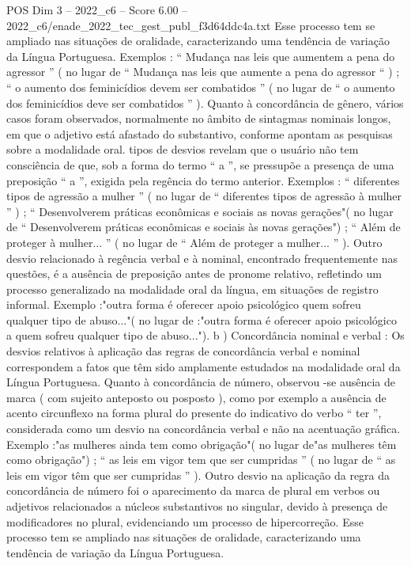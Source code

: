 \begin{textsample}{POS Dim 3 – 2022\_c6 – Score 6.00 – 2022\_c6/enade\_2022\_tec\_gest\_publ\_f3d64ddc4a.txt}
Esse processo tem se ampliado nas situações de oralidade, caracterizando uma tendência de variação da Língua Portuguesa.
Exemplos : “ Mudança nas leis que aumentem a pena do agressor ” ( no lugar de “ Mudança nas leis que aumente a pena do agressor “ ) ; “ o aumento dos feminicídios devem ser combatidos ” ( no lugar de “ o aumento dos feminicídios deve ser combatidos ” ).
Quanto à concordância de gênero, vários casos foram observados, normalmente no âmbito de sintagmas nominais longos, em que o adjetivo está afastado do substantivo, conforme apontam as pesquisas sobre a modalidade oral. tipos de desvios revelam que o usuário não tem consciência de que, sob a forma do termo “ a ”, se pressupõe a presença de uma preposição “ a ”, exigida pela regência do termo anterior.
Exemplos : “ diferentes tipos de agressão a mulher ” ( no lugar de “ diferentes tipos de agressão à mulher ” ) ; “ Desenvolverem práticas econômicas e sociais as novas gerações"( no lugar de “ Desenvolverem práticas econômicas e sociais às novas gerações") ; “ Além de proteger à mulher... ” ( no lugar de “ Além de proteger a mulher... ” ).
Outro desvio relacionado à regência verbal e à nominal, encontrado frequentemente nas questões, é a ausência de preposição antes de pronome relativo, refletindo um processo generalizado na modalidade oral da língua, em situações de registro informal.
Exemplo :"outra forma é oferecer apoio psicológico quem sofreu qualquer tipo de abuso..."( no lugar de :"outra forma é oferecer apoio psicológico a quem sofreu qualquer tipo de abuso..."). b ) Concordância nominal e verbal : Os desvios relativos à aplicação das regras de concordância verbal e nominal correspondem a fatos que têm sido amplamente estudados na modalidade oral da Língua Portuguesa.
Quanto à concordância de número, observou -se ausência de marca ( com sujeito anteposto ou posposto ), como por exemplo a ausência de acento circunflexo na forma plural do presente do indicativo do verbo “ ter ”, considerada como um desvio na concordância verbal e não na acentuação gráfica.
Exemplo :"as mulheres ainda tem como obrigação"( no lugar de"as mulheres têm como obrigação") ; “ as leis em vigor tem que ser cumpridas ” ( no lugar de “ as leis em vigor têm que ser cumpridas ” ).
Outro desvio na aplicação da regra da concordância de número foi o aparecimento da marca de plural em verbos ou adjetivos relacionados a núcleos substantivos no singular, devido à presença de modificadores no plural, evidenciando um processo de hipercorreção.
Esse processo tem se ampliado nas situações de oralidade, caracterizando uma tendência de variação da Língua Portuguesa.

\end{textsample}
